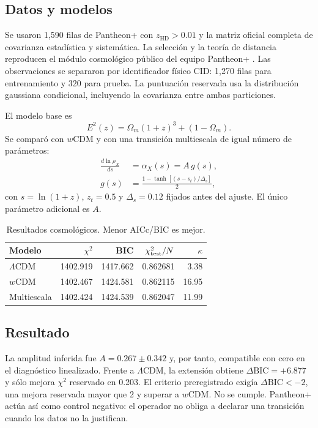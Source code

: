 \documentclass[10pt,twocolumn]{article}
\newcommand{\LCDM}{$\Lambda$CDM}
\begin{document}
\subsection{Datos y modelos}

Se usaron 1,590 filas de Pantheon+ con $z_{\mathrm{HD}}>0.01$ y la matriz
oficial completa de covarianza estadística y sistemática. La selección y la
teoría de distancia reproducen el módulo cosmológico público del equipo
Pantheon+ \cite{Brout2022,DataRelease}. Las observaciones se separaron por
identificador físico CID: 1,270 filas para entrenamiento y 320 para prueba.
La puntuación reservada usa la distribución gaussiana condicional, incluyendo
la covarianza entre ambas particiones.

El modelo base es
\begin{equation}
 E^2(z)=\Omega_m(1+z)^3+(1-\Omega_m).
\end{equation}
Se comparó con $w$CDM y con una transición multiescala de igual número de
parámetros:
\begin{align}
 \frac{d\ln\rho_X}{ds}&=\alpha_X(s)=A\,g(s),\\
 g(s)&=\frac{1-\tanh[(s-s_t)/\Delta_s]}{2},
\end{align}
con $s=\ln(1+z)$, $z_t=0.5$ y $\Delta_s=0.12$ fijados antes del ajuste. El
único parámetro adicional es $A$.

\begin{table}[t]
\centering
\caption{Resultados cosmológicos. Menor AICc/BIC es mejor.}
\small
\begin{tabular}{lrrrr}
\hline
Modelo & $\chi^2$ & BIC & $\chi^2_{\rm test}/N$ & $\kappa$\\
\hline
\LCDM & 1402.919 & 1417.662 & 0.862681 & 3.38\\
$w$CDM & 1402.467 & 1424.581 & 0.862115 & 16.95\\
Multiescala & 1402.424 & 1424.539 & 0.862047 & 11.99\\
\hline
\end{tabular}
\label{tab:cosmo}
\end{table}

\subsection{Resultado}

La amplitud inferida fue $A=0.267\pm0.342$ y, por tanto, compatible con cero
en el diagnóstico linealizado. Frente a \LCDM, la extensión obtiene
$\Delta\mathrm{BIC}=+6.877$ y sólo mejora $\chi^2$ reservado en 0.203. El
criterio preregistrado exigía $\Delta\mathrm{BIC}<-2$, una mejora reservada
mayor que 2 y superar a $w$CDM. No se cumple. Pantheon+ actúa así como control
negativo: el operador no obliga a declarar una transición cuando los datos no
la justifican.
\end{document}
